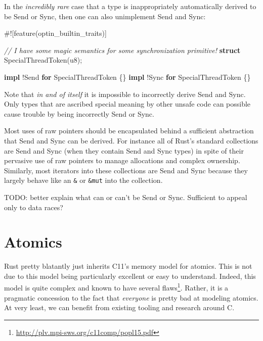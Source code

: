 \documentclass[a4paper,]{book}
\newenvironment{Shaded}{\begin{snugshade}}{\end{snugshade}}
\newcommand{\KeywordTok}[1]{\textcolor[rgb]{0.13,0.29,0.53}{\textbf{{#1}}}}
\newcommand{\DataTypeTok}[1]{\textcolor[rgb]{0.13,0.29,0.53}{{#1}}}
\newcommand{\CommentTok}[1]{\textcolor[rgb]{0.56,0.35,0.01}{\textit{{#1}}}}
\newcommand{\BuiltInTok}[1]{{#1}}
\newcommand{\AttributeTok}[1]{\textcolor[rgb]{0.77,0.63,0.00}{{#1}}}
\newcommand{\NormalTok}[1]{{#1}}
\renewcommand{\href}[2]{#2\footnote{\url{#1}}}
\begin{document}
In the \emph{incredibly rare} case that a type is inappropriately
automatically derived to be Send or Sync, then one can also unimplement
Send and Sync:

\begin{Shaded}
\begin{Highlighting}[]
\AttributeTok{#![}\NormalTok{feature}\AttributeTok{(}\NormalTok{optin_builtin_traits}\AttributeTok{)]}

\CommentTok{// I have some magic semantics for some synchronization primitive!}
\KeywordTok{struct} \NormalTok{SpecialThreadToken(}\DataTypeTok{u8}\NormalTok{);}

\KeywordTok{impl} \NormalTok{!}\BuiltInTok{Send} \KeywordTok{for} \NormalTok{SpecialThreadToken \{\}}
\KeywordTok{impl} \NormalTok{!}\BuiltInTok{Sync} \KeywordTok{for} \NormalTok{SpecialThreadToken \{\}}
\end{Highlighting}
\end{Shaded}

Note that \emph{in and of itself} it is impossible to incorrectly derive
Send and Sync. Only types that are ascribed special meaning by other
unsafe code can possible cause trouble by being incorrectly Send or
Sync.

Most uses of raw pointers should be encapsulated behind a sufficient
abstraction that Send and Sync can be derived. For instance all of
Rust's standard collections are Send and Sync (when they contain Send
and Sync types) in spite of their pervasive use of raw pointers to
manage allocations and complex ownership. Similarly, most iterators into
these collections are Send and Sync because they largely behave like an
\texttt{\&} or \texttt{\&mut} into the collection.

TODO: better explain what can or can't be Send or Sync. Sufficient to
appeal only to data races?

\section{Atomics}\label{sec--atomics}

Rust pretty blatantly just inherits C11's memory model for atomics. This
is not due to this model being particularly excellent or easy to
understand. Indeed, this model is quite complex and known to have
\href{http://plv.mpi-sws.org/c11comp/popl15.pdf}{several flaws}. Rather,
it is a pragmatic concession to the fact that \emph{everyone} is pretty
bad at modeling atomics. At very least, we can benefit from existing
tooling and research around C.
\end{document}
